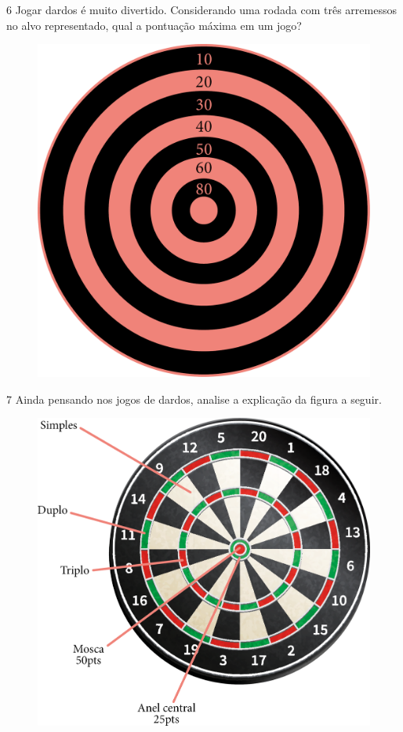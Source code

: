 \pagebreak

\num{6} Jogar dardos é muito divertido. Considerando uma rodada com três arremessos no alvo representado, qual a pontuação máxima em um jogo?

\begin{figure}[htpb!]
\centering
\includegraphics[width=.4\textwidth]{./media/image23.png}
\end{figure}


\num{7} Ainda pensando nos jogos de dardos, analise a explicação da figura a seguir.

\begin{figure}[htpb!]
\centering
\includegraphics[width=.6\textwidth]{./media/image24.png}
\end{figure}


